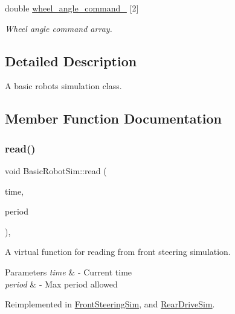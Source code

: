 \begin{DoxyCompactItemize}
\mbox{\label{classBasicRobotSim_ab454fb6e5feb31ae880e8efc3788f626}} 
double \hyperlink{classBasicRobotSim_ab454fb6e5feb31ae880e8efc3788f626}{wheel\+\_\+angle\+\_\+command\+\_\+} \mbox{[}2\mbox{]}
\begin{DoxyCompactList}\small\item\em Wheel angle command array. \end{DoxyCompactList}\end{DoxyCompactItemize}


\subsection{Detailed Description}
A basic robot\textquotesingle{}s simulation class. 

\subsection{Member Function Documentation}
\mbox{\label{classBasicRobotSim_a8e6a778a8f79818f01dcf0211a3b8e3f}} 
\subsubsection{\texorpdfstring{read()}{read()}}
{\footnotesize\ttfamily void Basic\+Robot\+Sim\+::read (\begin{DoxyParamCaption}\item[{const ros\+::\+Time \&}]{time,  }\item[{const ros\+::\+Duration \&}]{period }\end{DoxyParamCaption})\hspace{0.3cm}{\ttfamily [override]}, {\ttfamily [virtual]}}



A virtual function for reading from front steering simulation. 


\begin{DoxyParams}{Parameters}
{\em time} & -\/ Current time \\
\hline
{\em period} & -\/ Max period allowed \\
\hline
\end{DoxyParams}


Reimplemented in \hyperlink{classFrontSteeringSim_ac9eceb29112f8238e344cd467fae9814}{Front\+Steering\+Sim}, and \hyperlink{classRearDriveSim_a663d8885fa61436bdd1112b14f2c5a31}{Rear\+Drive\+Sim}.

